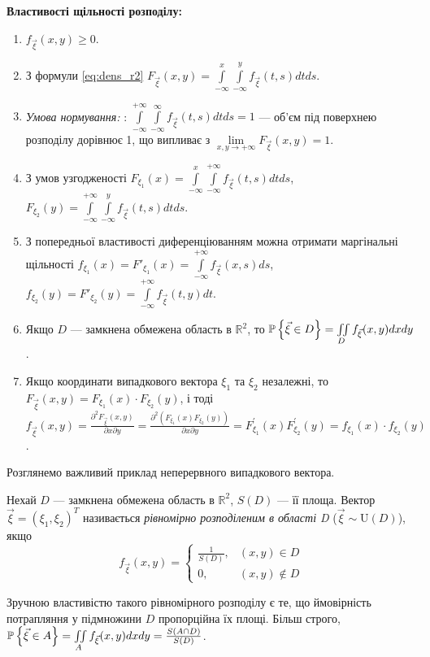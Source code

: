 \noindent\textbf{Властивості щільності розподілу:}
\begin{enumerate}
    \item $f_{\vec{\xi}}(x, y) \geq 0$.
    \item З формули \eqref{eq:dens_r2} $F_{\vec{\xi}}(x, y) 
    = \int\limits_{-\infty}^x \int\limits_{-\infty}^y f_{\vec{\xi}}(t, s) 
    dt ds $.
    \item \emph{Умова нормування:} : 
    $\int\limits_{-\infty}^{+\infty} \int\limits_{-\infty}^{\infty} f_{\vec{\xi}}(t, s) 
    dt ds = 1$ --- об'єм під поверхнею розподілу 
    дорівнює 1, що випливає з $\lim\limits_{x,y \to +\infty} F_{\vec{\xi}}(x, y) = 1$.
    \item З умов узгодженості $F_{\xi_1}(x) = \int\limits_{-\infty}^{x} \int\limits_{-\infty}^{+\infty} 
    f_{\vec{\xi}}(t, s) dt ds$,
    $F_{\xi_2}(y) = \int\limits_{-\infty}^{+\infty} \int\limits_{-\infty}^{y} 
    f_{\vec{\xi}}(t, s) dt ds$.
    \item З попередньої властивості диференціюванням можна отримати маргінальні щільності $f_{\xi_1}(x) = F'_{\xi_1}(x) 
    = \int\limits_{-\infty}^{+\infty} f_{\vec{\xi}}(x, s) ds $,
    $f_{\xi_2}(y) = F'_{\xi_2}(y) 
    = \int\limits_{-\infty}^{+\infty} f_{\vec{\xi}}(t, y) dt $.
    
    \item Якщо $D$ --- замкнена обмежена область в $\mathbb{R}^2$, то 
    $\P\left\{ \vec{\xi} \in D \right\} = \iint\limits_D f_{\vec{\xi}}(x, y) 
    dx dy$.
    \item Якщо координати випадкового вектора $\xi_1$ та $\xi_2$ незалежні, то
    $F_{\vec{\xi}}(x, y) = 
    F_{\xi_1}(x)\cdot F_{\xi_2}(y)$, і тоді
    $f_{\vec{\xi}}(x, y) = \frac{\partial^2 F_{\vec{\xi}}(x, y)}
    {\partial x \partial y} = \frac{\partial^2(F_{\xi_1}(x)F_{\xi_2}(y))}{\partial x \partial y} 
    = F_{\xi_1}^\prime (x)F_{\xi_2}^\prime (y) = 
    f_{\xi_1}(x)\cdot f_{\xi_2}(y)$.
\end{enumerate}
\vspace{1em}
Розглянемо важливий приклад неперервного випадкового вектора.
\begin{definition}
    Нехай $D$ --- замкнена обмежена область в $\mathbb{R}^2$,
    $S(D)$ --- її площа. 
    Вектор $\vec{\xi} = (\xi_1,\xi_2)^T$ називається 
    \emph{рівномірно розподіленим в області D} ($\vec{\xi} \sim \mathrm{U}(D)$), якщо 
    \begin{equation*}
        f_{\vec{\xi}}(x, y) = 
        \begin{cases}
            \frac{1}{S(D)},&(x, y) \in D \\
            0,&(x, y) \notin D
        \end{cases}
    \end{equation*}
\end{definition}
Зручною властивістю такого рівномірного розподілу є те, що
ймовірність потрапляння у підмножини $D$ пропорційна їх площі.
Більш строго, $\P\left\{\vec{\xi}\in A \right\} = \iint\limits_A f_{\vec{\xi}}(x, y) dx dy = 
\frac{S(A \cap D)}{S(D)}$.

